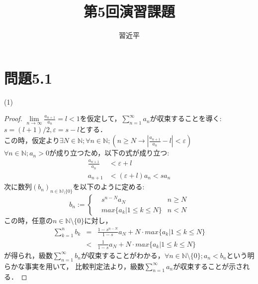 \documentclass{jarticle}
\begin{document}
\title{第5回演習課題}
\author{習近平}
\maketitle

\section*{問題5.1}
\noindent
(1)
\begin{proof}
$\lim\limits_{n \to \infty} \frac{a_{n+1}}{a_n}=l<1$を仮定して，$\sum\limits_{n=1}^{\infty}a_n$が収束することを導く:\\
$s=(l+1)/2, \varepsilon =s-l$とする．\\
この時，仮定より$\exists N \in \mathbb{N}; \forall n \in \mathbb{N} ; \left( n \ge N \rightarrow \left|\frac{a_{n+1}}{a_n} -l \right| < \varepsilon \right) $\\
$\forall n \in \mathbb{N} ; a_n >0$が成り立つため，以下の式が成り立つ:\\
\begin{equation}
\begin{aligned}
\frac{a_{n+1}}{a_n} &< \varepsilon +l \\
a_{n+1} &<(\varepsilon +l) a_n < sa_n
\end{aligned}
\end{equation}
次に数列$(b_n)_{n \in \mathbb{N} \setminus \{0\}}$を以下のように定める:\\
\begin{equation}
b_n := 
		\left\{ 
		\begin{aligned}
		&s^{n-N} a_N & n \ge N\\
		&max\{a_k|1 \le k \le N \} & n<N 
		\end{aligned} \right.
\end{equation}
この時，任意の$n \in \mathbb{N} \setminus \{0\}$に対し，\\
\begin{equation}
\begin{aligned}
\sum\limits_{k=1}^{n} b_k &=& \frac{1-s^{n-N}}{1-s} a_N + N \cdot max\{a_k|1 \le k \le N \} \\
			   &<& \frac{1}{1-s} a_N + N \cdot max\{a_k|1 \le k \le N \}
\end{aligned}
\end{equation}			   
が得られ，級数$\sum\limits_{n=1}^{\infty} b_n$が収束することがわかる，$\forall n \in  \mathbb{N} \setminus \{0\} ; a_n < b_n$という明らかな事実を用いて，
比較判定法より，級数$\sum\limits_{n=1}^{\infty} a_n$が収束することが示される．
\end{proof}
\end{document}
